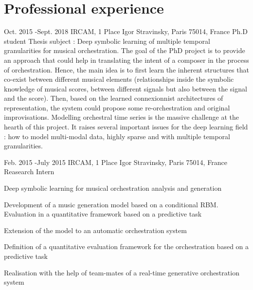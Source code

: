 \documentclass[10pt]{article} %
\begin{document}





\section{Professional experience}

\job
{Oct. 2015 -}{Sept. 2018}
{IRCAM, 1 Place Igor Stravinsky, Paris 75014, France}
{}
{Ph.D student}
{Thesis subject : Deep symbolic learning of multiple temporal granularities for musical orchestration. The goal of the PhD project is to provide an approach that could help in translating the intent of a composer in the process of orchestration. Hence, the main idea is to first learn the inherent structures that co-exist between different musical elements (relationships inside the symbolic knowledge of musical scores, between different signals but also between the signal and the score). Then, based on the learned connexionnist architectures of representation, the system could propose some re-orchestration and original improvisations. Modelling orchestral time series is the massive challenge at the hearth of this project. It raises several important issues for the deep learning field : how to model multi-modal data, highly sparse and with multiple temporal granularities.}


\job
{Feb. 2015 -}{July 2015}
{IRCAM, 1 Place Igor Stravinsky, Paris 75014, France}
{}
{Reasearch Intern}
{Deep symbolic learning for musical orchestration analysis and generation
\begin{itemize-noindent}
\item{Development of a music generation model based on a conditional RBM. Evaluation in a quantitative framework based on a predictive task}
\item{Extension of the model to an automatic orchestration system}
\item{Definition of a quantitative evaluation framework for the orchestration based on a predictive task}
\item{Realisation with the help of team-mates of a real-time generative orchestration system}
\end{itemize-noindent}
}
\end{document}
